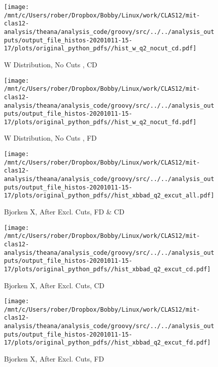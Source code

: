 \documentclass{article}
\begin{document}
\begin{landscape}
    \begin{figure}[h]
        \centering

        \texttt{[image: /mnt/c/Users/rober/Dropbox/Bobby/Linux/work/CLAS12/mit-clas12-analysis/theana/analysis\_code/groovy/src/../../analysis\_outputs/output\_file\_histos-20201011-15-17/plots/original\_python\_pdfs//hist\_w\_q2\_nocut\_cd.pdf]}
        \captionsetup{textformat=empty,labelformat=blank}
        \caption{W Distribution, No Cuts , CD}
    \end{figure}
    \clearpage
    
    \begin{figure}[h]
        \centering

        \texttt{[image: /mnt/c/Users/rober/Dropbox/Bobby/Linux/work/CLAS12/mit-clas12-analysis/theana/analysis\_code/groovy/src/../../analysis\_outputs/output\_file\_histos-20201011-15-17/plots/original\_python\_pdfs//hist\_w\_q2\_nocut\_fd.pdf]}
        \captionsetup{textformat=empty,labelformat=blank}
        \caption{W Distribution, No Cuts , FD}
    \end{figure}
    \clearpage
    
    \begin{figure}[h]
        \centering

        \texttt{[image: /mnt/c/Users/rober/Dropbox/Bobby/Linux/work/CLAS12/mit-clas12-analysis/theana/analysis\_code/groovy/src/../../analysis\_outputs/output\_file\_histos-20201011-15-17/plots/original\_python\_pdfs//hist\_xbbad\_q2\_excut\_all.pdf]}
        \captionsetup{textformat=empty,labelformat=blank}
        \caption{Bjorken X, After Excl. Cuts, FD \& CD}
    \end{figure}
    \clearpage
    
    \begin{figure}[h]
        \centering

        \texttt{[image: /mnt/c/Users/rober/Dropbox/Bobby/Linux/work/CLAS12/mit-clas12-analysis/theana/analysis\_code/groovy/src/../../analysis\_outputs/output\_file\_histos-20201011-15-17/plots/original\_python\_pdfs//hist\_xbbad\_q2\_excut\_cd.pdf]}
        \captionsetup{textformat=empty,labelformat=blank}
        \caption{Bjorken X, After Excl. Cuts, CD}
    \end{figure}
    \clearpage
    
    \begin{figure}[h]
        \centering

        \texttt{[image: /mnt/c/Users/rober/Dropbox/Bobby/Linux/work/CLAS12/mit-clas12-analysis/theana/analysis\_code/groovy/src/../../analysis\_outputs/output\_file\_histos-20201011-15-17/plots/original\_python\_pdfs//hist\_xbbad\_q2\_excut\_fd.pdf]}
        \captionsetup{textformat=empty,labelformat=blank}
        \caption{Bjorken X, After Excl. Cuts, FD}
    \end{figure}
    \clearpage
    

\end{landscape}
\end{document}
